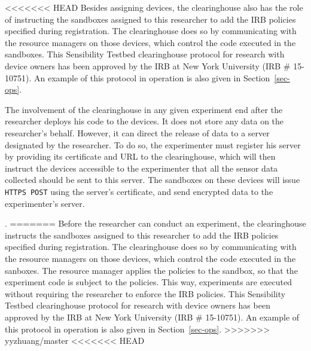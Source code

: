 {{<<<<<<< HEAD
Besides assigning devices, the clearinghouse also has the role of 
instructing the sandboxes assigned to this researcher to add the IRB 
policies specified during registration. The clearinghouse does so 
by communicating with the resource managers on those devices, which 
control the code executed in the sandboxes. 
This Sensibility Testbed clearinghouse 
protocol for research with device owners has been approved by
the IRB at New York University (IRB \# 15-10751). An example 
of this protocol in operation is also given in Section~\ref{sec-ops}.

The involvement of the clearinghouse in any given experiment end after the researcher deploys 
his code to the devices. It does not store any
data on the researcher's behalf. However, it can direct the release of data to a server designated by the researcher. To do so, the experimenter must register
his server by providing its certificate and URL to the
clearinghouse, which will then instruct the devices
accessible to the experimenter that all the sensor data collected should be
sent to this server. The sandboxes on these devices will issue
\texttt{HTTPS POST} using the server's certificate, and send encrypted
data to the experimenter's server.}.
=======
Before the researcher can conduct an experiment, the clearinghouse
instructs the sandboxes assigned to this researcher to add the IRB 
policies specified during registration. The clearinghouse does so 
by communicating with the resource managers on those devices, which 
control the code executed in the sanboxes. The resource manager 
applies the policies to the sandbox, so that the experiment code 
is subject to the policies. This way, 
experiments are executed without requiring the researcher to enforce 
the IRB policies. This Sensibility Testbed clearinghouse 
protocol for research with device owners has been approved by
the IRB at New York University (IRB \# 15-10751). An example 
of this protocol in operation is also given in Section~\ref{sec-ops}.
>>>>>>> yyzhuang/master
%
<<<<<<< HEAD


}
